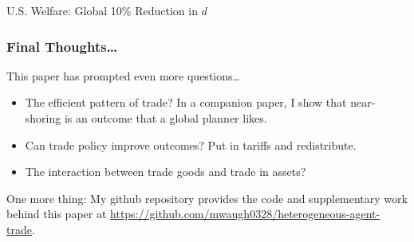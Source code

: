 \documentclass[9pt,pdftex,aspectratio=1610]{beamer}
\theoremstyle{definition}
\begin{document}

\begin{frame}[t]{U.S. Welfare: Global 10\% Reduction in $d$ }
\begin{figure}[!t]
\end{figure}
\end{frame}



\begin{frame}[t]
\frametitle{Final Thoughts\ldots}
\smallskip
This paper has prompted even more questions\ldots
\begin{itemize}
\smallskip
\item The efficient pattern of trade? In a companion paper, I show that near-shoring is an outcome that a global planner likes.
\smallskip
\item Can trade policy improve outcomes? Put in tariffs and redistribute.
\smallskip
\item The interaction between trade goods and trade in assets?
\end{itemize}
\medskip
\bigskip
One more thing: My github repository provides the code and supplementary work behind this paper at \url{https://github.com/mwaugh0328/heterogeneous-agent-trade}.

\end{frame}
\end{document}
